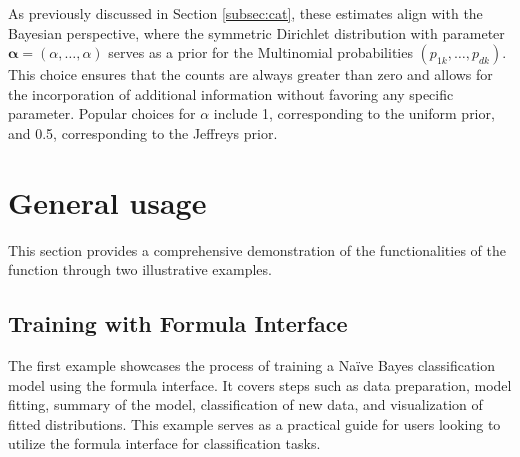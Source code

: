 \documentclass{article}\usepackage[]{graphicx}\usepackage[]{xcolor}
\begin{document}
As previously discussed in Section \ref{subsec:cat}, these estimates align with the Bayesian perspective, where the symmetric Dirichlet distribution with parameter $\boldsymbol{\alpha} = (\alpha,\ldots,\alpha)$ serves as a prior for the Multinomial probabilities $(p_{1k}, \ldots, p_{dk})$. This choice ensures that the counts are always greater than zero and allows for the incorporation of additional information without favoring any specific parameter. Popular choices for $\alpha$ include 1, corresponding to the uniform prior, and 0.5, corresponding to the Jeffreys prior.

\section{General usage}

This section provides a comprehensive demonstration of the functionalities of the \textcolor{darkgreen}{{}} function through two illustrative examples.

\subsection{Training with Formula Interface}

The first example showcases the process of training a Na\"ive Bayes classification model using the formula interface. It covers steps such as data preparation, model fitting, summary of the model, classification of new data, and visualization of fitted distributions. This example serves as a practical guide for users looking to utilize the formula interface for classification tasks.
\end{document}
